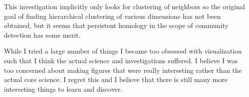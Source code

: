 \documentclass[letter,10pt,openany]{article}
\begin{document}
This investigation implicitly only looks for clustering of neighbors so
the original goal of finding hierarchical clustering of various dimensions has not
been obtained, but it seems that persistent homology in the scope of community detection has
some merit.



While I tried a large number of things I became too obsessed with visualization
such that I think the actual science and investigations suffered. I believe I was too
concerned about making figures that were really interesting rather than the
actual core science. I regret this and I believe that there is still many more interesting
things to learn and discover.






%
\end{document}
